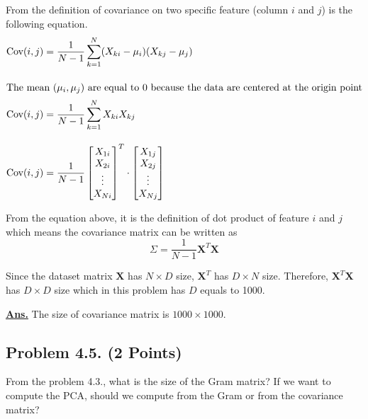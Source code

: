 \documentclass[12pt, a4paper]{article}
\begin{document}
            From the definition of covariance on two specific feature (column $i$ and $j$) is the following equation.
            \begin{align*}
                \text{Cov}(i, j) &= \frac{1}{N - 1} \sum_{k = 1}^{N}(X_{ki} - \mu_{i})(X_{kj} - \mu_{j}) \\[1em]
                \intertext{The mean ($\mu_{i}, \mu_{j}$) are equal to 0 because the data are centered at the origin point}
                \text{Cov}(i, j) &= \frac{1}{N - 1} \sum_{k = 1}^{N} X_{ki} X_{kj} \\[1em]
                \text{Cov}(i, j) &= \frac{1}{N - 1}
                    \begin{bmatrix}
                        X_{1i} \\
                        X_{2i} \\
                        \vdots \\
                        X_{Ni} \\
                    \end{bmatrix}^{T}
                    \cdot
                    \begin{bmatrix}
                        X_{1j} \\
                        X_{2j} \\
                        \vdots \\
                        X_{Nj} \\
                    \end{bmatrix}
            \end{align*}

            From the equation above, it is the definition of dot product of feature $i$ and $j$ which means the covariance matrix can be written as
            $$\Sigma = \frac{1}{N - 1} {\mathbf{X}}^{T} \mathbf{X}$$

            Since the dataset matrix $\mathbf{X}$ has $N \times D$ size, $\mathbf{X}^{T}$ has $D \times N$ size.
            Therefore, ${\mathbf{X}}^{T} \mathbf{X}$ has $D \times D$ size which in this problem has $D$ equals to 1000.

            \vspace{0.5em}

            \noindent \underline{\textbf{Ans.}} The size of covariance matrix is $1000 \times 1000$.

    \pagebreak

        \subsection{Problem 4.5. (2 Points)}
            From the problem 4.3., what is the size of the Gram matrix?
            If we want to compute the PCA, should we compute from the Gram or from the covariance matrix?
\end{document}
